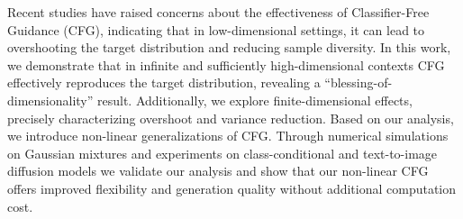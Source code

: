 Recent studies have raised concerns about the effectiveness of Classifier-Free Guidance (CFG), indicating that in low-dimensional settings, it can lead to overshooting the target distribution and reducing sample diversity. In this work, we  demonstrate that  in infinite and sufficiently high-dimensional contexts CFG effectively reproduces the target distribution, revealing a ``blessing-of-dimensionality'' result. Additionally, we explore finite-dimensional effects, precisely characterizing  overshoot and variance reduction.
Based on our analysis, we introduce non-linear generalizations of CFG. Through numerical simulations on Gaussian mixtures and  experiments on class-conditional and text-to-image diffusion models %
we validate our analysis and show that our non-linear CFG %
offers improved flexibility and generation quality without additional computation cost. 
